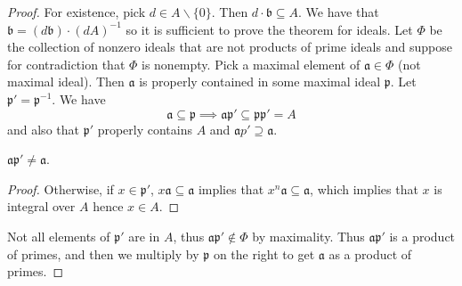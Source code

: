 \documentclass[10pt]{scrartcl}
\providecommand{\inv}{^{-1}}
\providecommand{\setdiff}{\smallsetminus}
\providecommand{\mf}[1]{\mathfrak{#1}}
\begin{document}
\begin{proof}
	For existence, pick $d\in A\setdiff\{0\}$.
	Then $d\cdot\mf b\subseteq A$. We have that $\mf b = (d\mf b)\cdot(dA)\inv$
	so it is sufficient to prove the theorem for ideals.
	Let $\Phi$ be the collection of nonzero ideals that are not
	products of prime ideals and suppose for contradiction that
	$\Phi$ is nonempty.
	Pick a maximal element of $\mf a\in\Phi$ (not maximal ideal).
	Then $\mf a$ is properly contained in some maximal ideal $\mf p$.
	Let $\mf p' = \mf p\inv$. We have
	\[\mf a\subseteq\mf p\implies \mf {ap}'\subseteq \mf{pp}' = A\]
	and also that $\mf p'$ properly contains $A$ and $\mf ap'\supseteq\mf a$.
	
	\begin{claim*}
		$\mf {ap}'\ne\mf a$.
	\end{claim*}
	\begin{proof}
		Otherwise, if $x\in\mf p'$, $x\mf a\subseteq \mf a$ implies that
		$x^n\mf a\subseteq\mf a$, which implies that $x$ is integral over $A$
		hence $x\in A$.
	\end{proof}
	Not all elements of $\mf p'$ are in $A$,
	thus $\mf {ap}'\notin\Phi$ by maximality.
	Thus $\mf{ap}'$ is a product of primes, and then we multiply by $\mf p$
	on the right to get $\mf a$ as a product of primes.
\end{proof}
\end{document}
